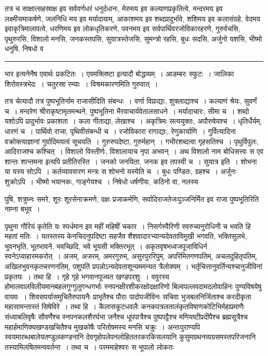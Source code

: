 \documentclass[11pt, openany]{book}
\begin{document}
तत्र च साक्षात्सहस्राक्ष इव सर्ववर्णधरं धनुर्दधानः, मेरुमय इव कल्याणप्रकृतित्वे, मन्दरमय इव लक्ष्मीसमाकर्षणे, जलनिधि मय इव मर्यादायाम्, आकाशमय इव शब्दप्रादुर्भावे, शशिमय इव कलासंग्रहे, वेदमय इवाकृत्रिमालापत्वे, धरणिमय इव लोकधृतिकरणे, पवनमय इव सर्वपार्थिवरजोविकारहरणे, गुरुर्वचसि, पृथुरुरसि, विशालो मनसि, जनकस्तपसि, सुयात्रस्तेजसि, सुमन्त्रो रहसि, बुधः सदसि, अर्जुनो यशसि, भीष्मो धनुषि, निषधो व\textendash

\vspace{2mm}
\hrule

\noindent
{\s भार इत्यनेनैष एवार्थः प्रकटितः~। एवमक्लिष्टा इत्यादौ बोद्धव्यम्~। आडम्बरः स्फुटः~। जालिका शिरोवस्त्रभेदः~। चतुरस्रा रम्याः~। विश्रमकारणमिति गुरुवात्~।

तत्र चेत्यादौ तत्र पुष्पभूतिर्नाम राजासीदिति संबन्धः~। वर्णा विप्राद्याः, शुक्लाद्याश्च~। कल्याणं श्रेयः, सुवर्णं च~। मन्दरेण श्रीराकृष्टामृतमन्थने, पुष्पभूतिना भैरवाचार्यवेतालसाधने~। मर्यादाचारः, सीमा च~। शब्दो यशोऽपि प्रादुर्भावः प्रकाशता~। कला गीताद्या, लेखाश्च~। अकृत्रिमः सत्ययुक्तः, अपौरुषेयश्च~। धृतिर्धैर्यम्, धारणं च~। पार्थिवो राजा, पृथिवीसंबन्धी च~। रजोविकारा रागाद्याः, रेणुकार्याणि~। गुर्वित्यादिना वक्रोक्त्याज्ञानां गुर्वादिमयत्वं सूचयति~। गुरुरुपदेष्टा, गुरुर्महान्~। गभीरशब्दत्वा गृहसतिश्च~। पृथुर्विपुलः, आदिराजश्च कश्चित्~। विशालो विस्तीर्णः, विशालायाच नृपा अभवन्~। अथ विशालो नाम बोधिसत्त्वः स एव शान्तः शान्तमना इत्यपि प्रतीतिरस्ति~। जनको जनयिता, जनक इव तपस्वी च~। {\qtt सुयात्र इति}~। शोभना या यस्य सोऽपि~। कर्तव्याववारण मन्त्रः स शोभनो यस्येति च~। बुधः पण्डितः, ग्रहश्च~। अर्जुनः शुक्रोऽपि~। भीष्मो भयानकः, गाङ्गेयश्च~। निषेधो धर्षणीयः, कठिनो वा, नलस्य}

\newpage

\noindent
पुषि, शत्रुघ्नः समरे, शूरः शूरसेनाक्रमणे, दक्षः प्रजाकर्मणि, सर्वादिराजतेजःपुञ्जनिर्मित इव राजा पुष्पभूतिरिति नाम्ना बभूव~।

पृथुना गौरियं कृतेति यः स्पर्धमान इव महीं महिषीं चकार~। निसर्गस्वैरिणी स्वरुच्यनुरोधिनी च भवति हि महतां मतिः~। यतस्तस्य केनचिदनुपदिष्टा सहजैव शैशवादारभ्यान्यदेवताविमुखी भगवति, भक्तिसुलभे, भुवनभृति, भूतभावने, भवच्छिदि, भवे भूयसी भक्तिरभूत्~। अकृतवृषभध्वजपूजाविधिर्न स्वनेऽप्याहारमकरोत्~। अजम्, अजरम्, अमरगुरुम्, असुरपुररिपुम्, अपरिमितगणपतिम्, अचलदुहितृपतिम्, अखिलभुवनकृतचरणनतिम्, पशुपतिं प्रपन्नोऽन्यदेवताशून्यममन्यत त्रैलोक्यम्~। भर्तृचित्तानुवर्तिन्यश्चानुजीविनां प्रकृतयः~। तथा हि~। गृहे गृहे भगवानपूज्यत खण्डपरशुः~। ववुरस्य होमालवालविलीयमानबहलगुग्गुलुगन्धगर्भाः स्नपनक्षीरशीकरक्षोदक्षारिणो बिल्वपल्लवदामदलोवाहिनः पुण्यविषयेषु वायवः~। शिवसपर्यासमुचितैरुपायनैः प्राभृतैश्च पौराः पादोपजीविनः सचिवा भुजबलनिर्जिताश्च करदीकृता महासामन्तास्तं सिषेविरे~। तथा हि~। कैलासकूटधवलैः कनकपत्रलतालंकृतविषाणकोटिभिर्महाप्रमाणैः संध्याबलिवृषैः सौवर्णैश्च स्नपनकलशैरर्घभा जनैश्च धूपपात्रैश्च पुष्पपट्टैश्च मणियष्टीप्रदीपैश्च ब्रह्मसूत्रैश्च महार्हमाणिक्यखण्डखचितैश्च मुखकोषैः परितोषमस्य मनसि चक्रुः~। अन्तःपुराण्यपि स्वयमारब्धबालेयतण्डुलकण्डनानि देवगृहोपलेपनलोहिततरकरकिसलयानि कुसुमग्रथनव्यग्रसमस्तपरिजनानि तस्यामिलषितमन्ववर्तन्त~। तथा च~। परममाहेश्वरः स भूपालो लोकतः
\end{document}
